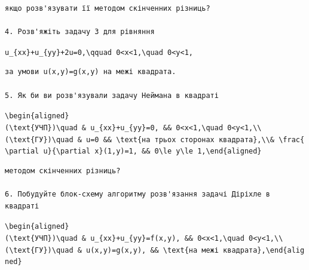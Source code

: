 \documentclass[
  ukrainian,
]{article}
\begin{document}
\begin{verbatim}
якщо розв'язувати її методом скінченних різниць?

4. Розв'яжіть задачу 3 для рівняння
\end{verbatim}

\texttt{u\_\{xx\}+u\_\{yy\}+2u=0,\textbackslash{}qquad\ 0\textless{}x\textless{}1,\textbackslash{}quad\ 0\textless{}y\textless{}1,}

\begin{verbatim}
за умови u(x,y)=g(x,y) на межі квадрата.

5. Як би ви розв'язували задачу Неймана в квадраті
\end{verbatim}

\texttt{\textbackslash{}begin\{aligned\}(\textbackslash{}text\{УЧП\})\textbackslash{}quad\ \&\ u\_\{xx\}+u\_\{yy\}=0,\ \&\&\ 0\textless{}x\textless{}1,\textbackslash{}quad\ 0\textless{}y\textless{}1,\textbackslash{}\textbackslash{}(\textbackslash{}text\{ГУ\})\textbackslash{}quad\ \&\ u=0\ \&\&\ \textbackslash{}text\{на\ трьох\ сторонах\ квадрата\},\textbackslash{}\textbackslash{}\&\ \textbackslash{}frac\{\textbackslash{}partial\ u\}\{\textbackslash{}partial\ x\}(1,y)=1,\ \&\&\ 0\textbackslash{}le\ y\textbackslash{}le\ 1,\textbackslash{}end\{aligned\}}

\begin{verbatim}
методом скінченних різниць?

6. Побудуйте блок-схему алгоритму розв'язання задачі Діріхле в квадраті
\end{verbatim}

\texttt{\textbackslash{}begin\{aligned\}(\textbackslash{}text\{УЧП\})\textbackslash{}quad\ \&\ u\_\{xx\}+u\_\{yy\}=f(x,y),\ \&\&\ 0\textless{}x\textless{}1,\textbackslash{}quad\ 0\textless{}y\textless{}1,\textbackslash{}\textbackslash{}(\textbackslash{}text\{ГУ\})\textbackslash{}quad\ \&\ u(x,y)=g(x,y),\ \&\&\ \textbackslash{}text\{на\ межі\ квадрата\},\textbackslash{}end\{aligned\}}
\end{document}
